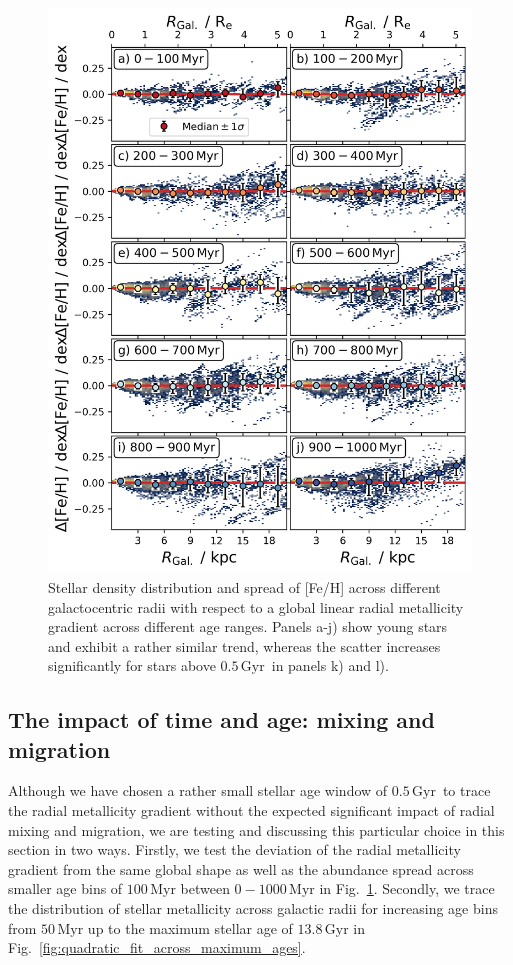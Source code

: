 \documentclass[twocolumn,apj,numberedappendix,appendixfloats,twocolappendix]{openjournal}
\newcommand{\nihaoAGEmax}{$0.5\,\mathrm{Gyr}$}
\begin{document}
\begin{CJK*}{UTF8}{gbsn}
\begin{figure}
    \centering
    \includegraphics[width=\columnwidth]{figures/scatter_with_increasing_age.png}
    \caption{Stellar density distribution and spread of [Fe/H] across different galactocentric radii with respect to a global linear radial metallicity gradient across different age ranges. Panels a-j) show young stars and exhibit a rather similar trend, whereas the scatter increases significantly for stars above \nihaoAGEmax\ in panels k) and l).}
    \label{fig:scatter_with_increasing_age}
\end{figure}

\subsection{The impact of time and age: mixing and migration} \label{sec:discussion_time}

Although we have chosen a rather small stellar age window of \nihaoAGEmax\ to trace the radial metallicity gradient without the expected significant impact of radial mixing and migration, we are testing and discussing this particular choice in this section in two ways. Firstly, we test the deviation of the radial metallicity gradient from the same global shape as well as the abundance spread across smaller age bins of $100\,\mathrm{Myr}$ between $0-1000\,\mathrm{Myr}$ in Fig.~\ref{fig:scatter_with_increasing_age}. Secondly, we trace the distribution of stellar metallicity across galactic radii for increasing age bins from $50\,\mathrm{Myr}$ up to the maximum stellar age of $13.8\,\mathrm{Gyr}$ in Fig.~\ref{fig:quadratic_fit_across_maximum_ages}.


\end{CJK*}
\end{document}
